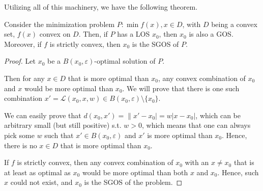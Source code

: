 Utilizing all of this machinery, we have the following theorem.

\begin{theorem}
  Consider the minimization problem \( P: \min f(x), x \in D \), with \( D \) being
  a convex set, \( f(x) \) convex on \( D \). Then, if \( P \) has a LOS \(
  x_{0} \), then \( x_{0} \) is also a GOS. Moreover, if \( f \) is strictly
  convex, then \( x_{0} \) is the SGOS of \( P \).
\end{theorem}

\begin{proof}
  Let \( x_{0} \) be a \( B(x_{0}, \varepsilon) \)-optimal solution of \( P \).

  Then for any \( x \in D \) that is more optimal than \( x_{0} \),
  any convex combination of \( x_{0} \) and \( x \) would be more optimal than
  \( x_{0} \). We will prove that there is one such combination \( x' =
  \mathcal{L}(x_{0}, x, w) \in B(x_{0}, \varepsilon) \setminus \{x_{0}\}   \).

  We can easily prove that \( d(x_{0}, x') = \|x'-x_{0}| = w|x-x_{0}| \), which
  can be arbitrary small (but still positive)
  s.t. \( w > 0 \), which means that one can always pick
  some \( w \) such that \( x' \in B(x_{0}, \varepsilon) \) and \( x' \) is more
  optimal than \( x_{0} \). Hence, there is no \( x \in D \) that is more
  optimal than \( x_{0} \).

  If \( f \) is strictly convex, then any convex combination of \( x_{0} \) with
  an \( x \neq  x_{0}  \) that is at least as optimal as \( x_{0} \)
  would be more optimal than both \( x \) and \( x_{0} \). Hence, such \( x \)
  could not exist, and \( x_{0} \) is the SGOS of the problem.
\end{proof}




